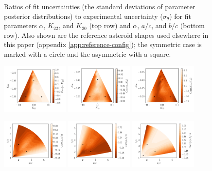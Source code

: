 \documentclass[linenumbers]{aastex631}
\begin{document}
\begin{figure}
  \caption{Ratios of fit uncertainties (the standard deviations of parameter posterior distributions) to experimental uncertainty ($\sigma_\theta$) for fit parameters $\alpha$, $K_{22}$, and $K_{20}$ (top row) and $\alpha$, $a/c$, and $b/c$ (bottom row). Also shown are the reference asteroid shapes used elsewhere in this paper (appendix \ref{app:reference-config}); the symmetric case is marked with a circle and the asymmetric with a square.}
  \label{fig:probe-space-sigma}
\end{figure}

\begin{figure}
  \includegraphics[width=0.3\textwidth]{probe-space-corr12.pdf}\hfill
  \includegraphics[width=0.3\textwidth]{probe-space-corr13.pdf}\hfill
  \includegraphics[width=0.3\textwidth]{probe-space-corr23.pdf}

  \includegraphics[width=0.3\textwidth]{probe-space-ab-1a.pdf}\hfill
  \includegraphics[width=0.3\textwidth]{probe-space-ab-1b.pdf}\hfill
  \includegraphics[width=0.3\textwidth]{probe-space-ab-ab.pdf}
  

\end{figure}
\end{document}
